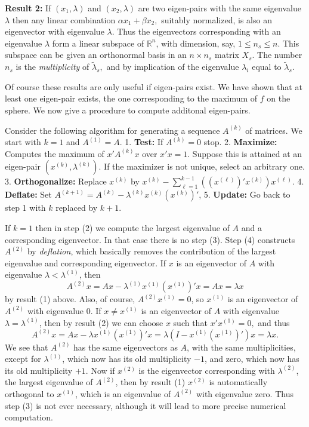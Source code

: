 \documentclass[
  12pt,
]{book}
\begin{document}
\textbf{Result 2:} If \((x_1,\lambda)\) and \((x_2,\lambda)\) are two
eigen-pairs with the same eigenvalue \(\lambda\) then any linear combination \(\alpha x_1+\beta x_2,\) suitably normalized,
is also an eigenvector with eigenvalue \(\lambda\).
Thus the eigenvectors corresponding with an
eigenvalue \(\lambda\) form a linear subspace of \(\mathbb{R}^n\), with dimension, say, \(1\leq n_s\leq n\).
This subspace can be given an orthonormal basis in
an \(n\times n_s\) matrix \(X_s\). The number \(n_s\) is the \emph{multiplicity} of \(\tilde\lambda_s,\) and by implication of the eigenvalue \(\lambda_i\) equal to \(\tilde\lambda_s\).

Of course these results are only useful if eigen-pairs exist. We have shown that at least one eigen-pair exists, the one corresponding to the maximum of \(f\) on the sphere. We now give a procedure to compute additonal eigen-pairs.

Consider the following algorithm for generating
a sequence \(A^{(k)}\) of matrices. We start
with \(k=1\) and \(A^{(1)}=A\).
1. \textbf{Test:} If \(A^{(k)}=0\) stop.
2. \textbf{Maximize:} Computes the maximum of \(x'A^{(k)}x\) over \(x'x=1\). Suppose this is attained at an eigen-pair \((x^{(k)},\lambda^{(k)})\). If the maximizer is not unique, select an arbitrary one.
3. \textbf{Orthogonalize:} Replace \(x^{(k)}\) by \(x^{(k)}-\sum_{\ell=1}^{k-1}((x^{(\ell)})'x^{(k)})x^{(\ell)}.\)
4. \textbf{Deflate:} Set \(A^{(k+1)}=A^{(k)}-\lambda^{(k)}x^{(k)}(x^{(k)})'\),
5. \textbf{Update:} Go back to step 1 with \(k\) replaced by \(k+1\).

If \(k=1\) then in step (2) we compute the largest eigenvalue of \(A\) and a corresponding eigenvector. In that case there is no step (3). Step (4) constructs \(A^{(2)}\) by \emph{deflation}, which basically removes the
contribution of the largest eigenvalue and corresponding eigenvector.
If \(x\) is an eigenvector of \(A\) with eigenvalue \(\lambda<\lambda^{(1)}\), then
\[
A^{(2)}x=Ax-\lambda^{(1)}x^{(1)}(x^{(1)})'x=Ax=\lambda x
\]
by result (1) above. Also, of course, \(A^{(2)}x^{(1)}=0\), so \(x^{(1)}\)
is an eigenvector of \(A^{(2)}\) with eigenvalue \(0\). If \(x\not= x^{(1)}\) is an eigenvector of \(A\) with eigenvalue \(\lambda=\lambda^{(1)}\), then by result (2) we can choose \(x\) such
that \(x'x^{(1)}=0,\) and thus
\[
A^{(2)}x=Ax-\lambda x^{(1)}(x^{(1)})'x=\lambda(I-x^{(1)}(x^{(1)})')x=\lambda x.
\]
We see that \(A^{(2)}\) has the same eigenvectors as \(A\), with the same multiplicities, except for \(\lambda^{(1)}\), which now has
its old multiplicity \(-1\), and zero, which now has its old multiplicity \(+1\). Now if \(x^{(2)}\) is the eigenvector corresponding with \(\lambda^{(2)}\), the largest eigenvalue of \(A^{(2)}\), then by result (1) \(x^{(2)}\)
is automatically orthogonal to \(x^{(1)}\), which is an eigenvalue
of \(A^{(2)}\) with eigenvalue zero. Thus step (3) is not ever necessary, although it will lead to more precise numerical computation.
\end{document}
